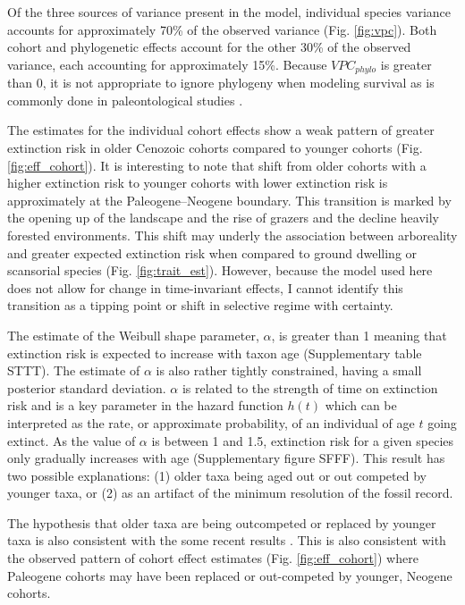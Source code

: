 \documentclass[12pt]{article}
\begin{document}
Of the three sources of variance present in the model, individual species variance accounts for approximately 70\% of the observed variance (Fig. \ref{fig:vpc}). Both cohort and phylogenetic effects account for the other 30\% of the observed variance, each accounting for approximately 15\%. Because $VPC_{phylo}$ is greater than 0, it is not appropriate to ignore phylogeny when modeling survival \cite{Housworth2004} as is commonly done in paleontological studies \cite{Alroy2009,Foote2013,Jablonski2006a,Hunt2007a,Liow2008,Payne2007}. 

The estimates for the individual cohort effects show a weak pattern of greater extinction risk in older Cenozoic cohorts compared to younger cohorts (Fig. \ref{fig:eff_cohort}). It is interesting to note that shift from older cohorts with a higher extinction risk to younger cohorts with lower extinction risk is approximately at the Paleogene--Neogene boundary. This transition is marked by the opening up of the landscape and the rise of grazers and the decline heavily forested environments. This shift may underly the association between arboreality and greater expected extinction risk when compared to ground dwelling or scansorial species (Fig. \ref{fig:trait_est}). However, because the model used here does not allow for change in time-invariant effects, I cannot identify this transition as a tipping point or shift in selective regime with certainty.

The estimate of the Weibull shape parameter, $\alpha$, is greater than 1 meaning that extinction risk is expected to increase with taxon age (Supplementary table STTT). The estimate of $\alpha$ is also rather tightly constrained, having a small posterior standard deviation. $\alpha$ is related to the strength of time on extinction risk and is a key parameter in the hazard function $h(t)$ which can be interpreted as the rate, or approximate probability, of an individual of age $t$ going extinct. As the value of $\alpha$ is between 1 and 1.5, extinction risk for a given species only gradually increases with age (Supplementary figure SFFF). This result has two possible explanations: (1) older taxa being aged out or out competed by younger taxa, or (2) as an artifact of the minimum resolution of the fossil record.

The hypothesis that older taxa are being outcompeted or replaced by younger taxa is also consistent with the some recent results \cite{Wagner2014b,Quental2013}. This is also consistent with the observed pattern of cohort effect estimates (Fig. \ref{fig:eff_cohort}) where Paleogene cohorts may have been replaced or out-competed by younger, Neogene cohorts.
\end{document}
